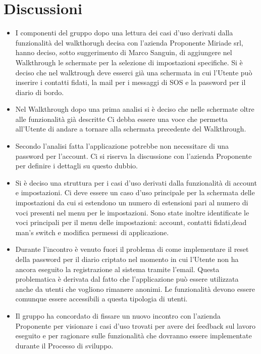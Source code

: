 \documentclass[a4paper,12pt]{article}
\begin{document}
\section{Discussioni}
\begin{itemize}
    \item I componenti del gruppo dopo una lettura dei casi d'uso derivati dalla funzionalità del walkthorugh decisa con l'azienda Proponente Miriade srl, hanno deciso, sotto suggerimento di Marco Sanguin, di aggiungere nel Walkthrough le schermate per la selezione di impostazioni specifiche. Si è deciso che nel walktrough deve esserci già una schermata in cui l'Utente può inserire i contatti fidati, la mail per i messaggi di SOS e la password per il diario di bordo.
    \item Nel Walkthrough dopo una prima analisi si è deciso che nelle schermate oltre alle funzionalità già descritte Ci debba essere una voce che permetta all'Utente di andare a tornare alla schermata precedente del Walkthrough.
    \item Secondo l'analisi fatta l'applicazione potrebbe non necessitare di una password per l'account. Ci si riserva la discussione con l'azienda Proponente per definire i dettagli su questo dubbio.
    \item Si è deciso una struttura per i casi d'uso derivati dalla funzionalità di account e impostazioni. Ci deve essere un caso d'uso principale per la schermata delle impostazioni da cui si estendono un numero di estensioni pari al numero di voci presenti nel menu per le impostazioni. Sono state  inoltre identificate le voci principali per il menu delle impostazioni: account, contatti fidati,dead man's switch e modifica permessi di applicazione.
    \item Durante l'incontro è venuto fuori il problema di come implementare il reset della password per il diario criptato nel momento in cui l'Utente non ha ancora eseguito la registrazione al sistema tramite l'email. Questa problematica è derivata dal fatto che l'applicazione può essere utilizzata anche da utenti che vogliono rimanere anonimi. Le funzionalità devono essere comunque essere accessibili a questa tipologia di utenti. 
    \item Il gruppo ha concordato di fissare un nuovo incontro con l'azienda Proponente per visionare i casi d'uso trovati per avere dei feedback sul lavoro eseguito e per ragionare sulle funzionalità che dovranno essere implementate durante il Processo di sviluppo.
\end{itemize}
\end{document}
